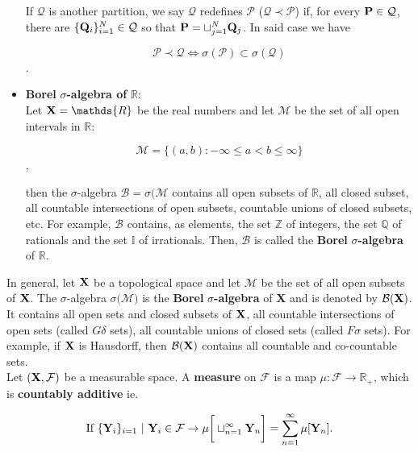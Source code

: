 \documentclass{homework}
\begin{document}
\begin{itemize}
    If $\mathcal{Q}$ is another partition, we say $\mathcal{Q}$ redefines $\mathcal{P}$ ($\mathcal{Q}\prec \mathcal{P}$) if, for every ${\bf P}\in \mathcal{Q}$, there are $\{{\bf Q}_i\}_{i=1}^{N} \in \mathcal{Q}$ so that ${\bf P} = \sqcup_{j=1}^{N} {\bf Q}_{j}$. In said case we have 
    
    $$
    \mathcal{P}\prec \mathcal{Q} \Leftrightarrow \sigma(\mathcal{P}) \subset \sigma(\mathcal{Q})
    $$. \\
    
    \clearpage
    
    \item \textbf{Borel } $\sigma$\textbf{-algebra of } $\mathds{R}$: \\
    
    Let ${\bf X} =\mathds{R}$ be the real numbers and let $\mathcal{M}$ be the set of all open intervals in $\mathds{R}$:
    
    $$
    \mathcal{M} = \{(a,b): -\infty \leq a < b \leq \infty\}
    $$,
    
    then the $\sigma$-algebra $\mathcal{B} = \sigma(\mathcal{M}$ contains all open subsets of $\mathds{R}$, all closed subset, all countable intersections of open subsets, countable unions of closed subsets, etc. For example, $\mathcal{B}$ contains, as elements, the set $\mathds{Z}$ of integers, the set $\mathds{Q}$ of rationals and the set $\mathds{I}$ of irrationals. Then, $\mathcal{B}$ is called the \textbf{Borel} $\sigma$\textbf{-algebra} of $\mathds{R}$. \\
\end{itemize}

In general, let ${\bf X}$ be a topological space and let $\mathcal{M}$ be the set of all open subsets of ${\bf X}$. The $\sigma$-algebra $\sigma(\mathcal{M)}$ is the \textbf{Borel} $\sigma$\textbf{-algebra} of {\bf X} and is denoted by $\mathcal{B}({\bf X})$. It contains all open sets and closed subsets of ${{\bf X}}$, all countable intersections of open sets (called $G\delta$ sets), all countable unions of closed sets (called $F\sigma$ sets). For example, if ${\bf X}$ is Hausdorff, then $\mathcal{B}({\bf X})$ contains all countable and co-countable sets.\\

Let $({\bf X}, \mathcal{F})$ be a measurable space. A \textbf{measure} on $\mathcal{F}$ is a map $\mu: \mathcal{F} \rightarrow \mathds{R}_{+}$, which is \textbf{countably additive} ie. 

$$
\textnormal{If } \{{\bf Y}_i\}_{i=1} \textnormal{ }| \textnormal{ } {\bf Y}_i \in \mathcal{F} \rightarrow \mu\bigg[\sqcup_{n=1}^{\infty}{\bf Y}_n\bigg] = \sum_{n=1}^{\infty} \mu[{\bf Y}_n].
$$
\end{document}
